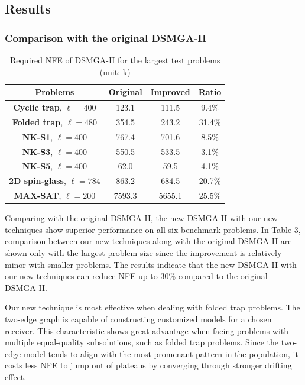 \documentclass{sig-alternate-05-2015}
\begin{document}
\subsection{Results}

\subsubsection{ Comparison with the original DSMGA-II }

\begin{table}[ht]
\centering
\begin{tabular}{ |c|c|c|c| } \hline
\textbf{Problems}& \textbf{Original} & \textbf{Improved} & \textbf{Ratio}\\ \hline
\textbf{Cyclic trap}, $\ell = 400$ 		& 123.1&111.5&9.4\%\\ \hline
\textbf{Folded trap}, $\ell = 480$	 	& 354.5& 243.2&31.4\%\\ \hline
\textbf{NK-S1}, $\ell = 400$ 				& 767.4& 701.6&8.5\%\\ \hline
\textbf{NK-S3}, $\ell = 400$ 				& 550.5& 533.5&3.1\%\\ \hline
\textbf{NK-S5}, $\ell = 400$ 				& 62.0& 59.5&4.1\%\\ \hline
\textbf{2D spin-glass}, $\ell = 784$ 	& 863.2&684.5&20.7\%\\ \hline
\textbf{MAX-SAT}, $\ell = 200$ 			& 7593.3& 5655.1&25.5\%\\ \hline
\end{tabular}
\caption{Required NFE of DSMGA-II for the largest test problems (unit: k)}
\end{table}

Comparing with the original DSMGA-II, the new DSMGA-II with our new techniques show superior performance on all six benchmark problems.
In Table 3, comparison between our new techniques along with the original DSMGA-II are shown only with the largest problem size since the improvement is relatively minor with smaller problems. 
The results indicate that the new DSMGA-II with our new techniques can reduce NFE up to 30\% compared to the original DSMGA-II. 


Our new technique is most effective when dealing with folded trap problems.
The two-edge graph is capable of constructing customized models for a chosen receiver. 
This characteristic shows great advantage when facing problems with multiple equal-quality subsolutions, such as folded trap problems.
Since the two-edge model tends to align with the most promenant pattern in the population, it costs less NFE to jump out of plateaus by converging through stronger drifting effect.
\end{document}
